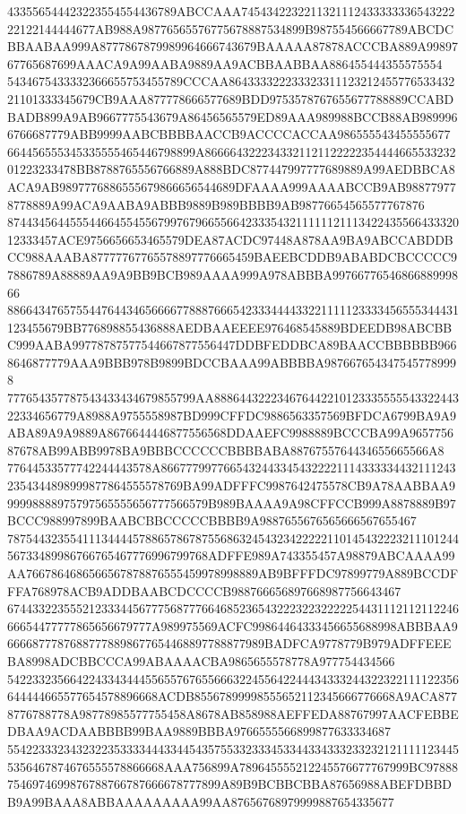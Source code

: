 433556544423223554554436789ABCCAAA745434223221132111243333333654322222122144444677AB988A98776565576775678887534899B987554566667789ABCDCBBAABAA999A8777867879989964666743679BAAAAA87878ACCCBA889A9989767765687699AAACA9A99AABA9889AA9ACBBAABBAA886455444355575554
5434675433332366655753455789CCCAA86433332223332331112321245577653343221101333345679CB9AAA877778666577689BDD9753578767655677788889CCABDBADB899A9AB9667775543679A86456565579ED89AAA989988BCCB88AB9899966766687779ABB9999AABCBBBBAACCB9ACCCCACCAA986555543455555677
664456555345335555465446798899A866664322234332112112222235444466553323201223233478BB8788765556766889A888BDC877447997777689889A99AEDBBCA8ACA9AB9897776886555679866656544689DFAAAA999AAAABCCB9AB988779778778889A99ACA9AABA9ABBB9889B989BBBB9AB98776654565577767876
87443456445554466455455679976796655664233354321111112111342243556643332012333457ACE9756656653465579DEA87ACDC97448A878AA9BA9ABCCABDDBCC988AAABA87777767765578897776665459BAEEBCDDB9ABABDCBCCCCC97886789A88889AA9A9BB9BCB989AAAA999A978ABBBA9976677654686688999866
886643476575544764434656666778887666542333444433221111123333456555344431123455679BB776898855436888AEDBAAEEEE976468545889BDEEDB98ABCBBC999AABA99778787577544667877556447DDBFEDDBCA89BAACCBBBBBB9668646877779AAA9BBB978B9899BDCCBAAA99ABBBBA9876676543475457789998
777654357787543433434679855799AA88864432223467644221012333555554332244322334656779A8988A9755558987BD999CFFDC9886563357569BFDCA6799BA9A9ABA89A9A9889A8676644446877556568DDAAEFC9988889BCCCBA99A965775687678AB99ABB9978BA9BBBCCCCCCBBBBABA8876755764434655665566A8
77644533577742244443578A866777997766543244334543222211143333344321112432354344898999877864555578769BA99ADFFFC9987642475578CB9A78AABBAA999998888975797565555656777566579B989BAAAA9A98CFFCCB999A8878889B97BCCC988997899BAABCBBCCCCCBBBB9A9887655676565666567655467
78754432355411134444578865786787556863245432342222211014543222321110124456733489986766765467776996799768ADFFE989A743355457A98879ABCAAAA99AA7667864686566567878876555459978998889AB9BFFFDC97899779A889BCCDFFFA768978ACB9ADDBAABCDCCCCB988766656897668987756643467
67443322355521233344567775687776646852365432223223222225443111211211224666654477777865656679777A989975569ACFC99864464333456655688998ABBBAA966668777876887778898677654468897788877989BADFCA9778779B979ADFFEEEBA8998ADCBBCCCA99ABAAAACBA9865655578778A977754434566
542233235664224334344455655767655666322455642244434333244322322111122356644444665577654578896668ACDB85567899998555652112345666776668A9ACA8778776788778A98778985577755458A8678AB858988AEFFEDA88767997AACFEBBEDBAA9ACDAABBBB99BAA9889BBBA9766555566899877633334687
5542233323432322353333444334454357553323334533443343332332321211111234455356467874676555578866668AAA756899A789645555212245576677767999BC978887546974699876788766787666678777899A89B9BCBBCBBA87656988ABEFDBBDB9A99BAAA8ABBAAAAAAAAA99AA87656768979999887654335677
